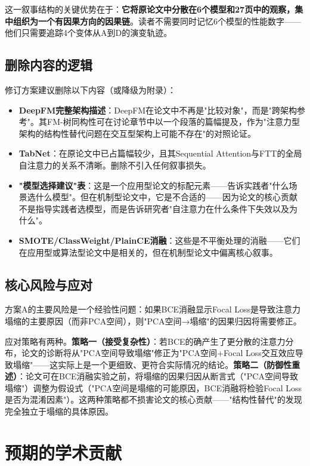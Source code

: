 \documentclass[UTF8,a4paper,12pt,fontset=fandol]{ctexart}
\begin{document}
这一叙事结构的关键优势在于：\textbf{它将原论文中分散在6个模型和27页中的观察，集中组织为一个有因果方向的因果链}。读者不需要同时记忆6个模型的性能数字——他们只需要追踪4个变体从A到D的演变轨迹。

\subsection{删除内容的逻辑}

修订方案建议删除以下内容（或降级为附录）：

\begin{itemize}
    \item \textbf{DeepFM完整架构描述}：DeepFM在论文中不再是"比较对象"，而是"跨架构参考"。其FM-树同构性可在讨论章节中以一个段落的篇幅提及，作为"注意力型架构的结构性替代问题在交互型架构上可能不存在"的对照论证。
    \item \textbf{TabNet}：在原论文中已占篇幅较少，且其Sequential Attention与FTT的全局自注意力的关系不清晰。删除不引入任何叙事损失。
    \item \textbf{"模型选择建议"表}：这是一个应用型论文的标配元素——告诉实践者"什么场景选什么模型"。但在机制型论文中，它是不合适的——因为论文的核心贡献不是指导实践者选模型，而是告诉研究者"自注意力在什么条件下失效以及为什么"。
    \item \textbf{SMOTE/ClassWeight/PlainCE消融}：这些是不平衡处理的消融——它们在应用型或算法型论文中是相关的，但在机制型论文中偏离核心叙事。
\end{itemize}

\subsection{核心风险与应对}

方案A的主要风险是一个经验性问题：如果BCE消融显示Focal Loss是导致注意力塌缩的主要原因（而非PCA空间），则"PCA空间→塌缩"的因果归因将需要修正。

应对策略有两种。\textbf{策略一（接受复杂性）}：若BCE的确产生了更分散的注意力分布，论文的诊断将从"PCA空间导致塌缩"修正为"PCA空间+Focal Loss交互效应导致塌缩"——这实际上是一个更细致、更符合实际情况的结论。\textbf{策略二（防御性重述）}：论文可在BCE消融实验之前，将塌缩的因果归因从断言式（"PCA空间导致塌缩"）调整为假设式（"PCA空间是塌缩的可能原因，BCE消融将检验Focal Loss是否为混淆因素"）。这两种策略都不损害论文的核心贡献——"结构性替代"的发现完全独立于塌缩的具体原因。

\section{预期的学术贡献}
\end{document}
